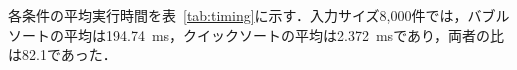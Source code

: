 各条件の平均実行時間を表~\ref{tab:timing}に示す．入力サイズ8,000件では，バブルソートの平均は\SI{194.74}{ms}，クイックソートの平均は\SI{2.372}{ms}であり，両者の比は82.1であった．
